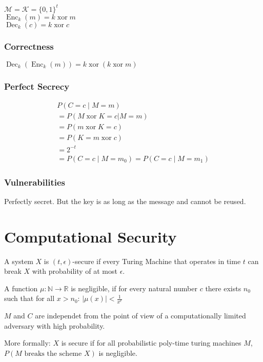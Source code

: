 \documentclass[11pt]{article}
\DeclareMathOperator{\Enc}{Enc}
\DeclareMathOperator{\Dec}{Dec}
\DeclareMathOperator{\xor}{xor}
\begin{document}
    $\mathcal{M} = \mathcal{K} = \{0, 1\}^t$\\
    $\Enc_k(m) = k \xor m$\\
    $\Dec_k(c) = k \xor c$

    \subsubsection{Correctness}

    $\Dec_k(\Enc_k(m)) = k \xor (k \xor m)$

    \subsubsection{Perfect Secrecy}

    \begin{align}
        P(C = c \mid M = m)\\
        = P(M \xor K = c | M = m)\\
        = P(m \xor K = c)\\
        = P(K = m \xor c)\\
        = 2^{-t}\\
        = P(C = c \mid M = m_0) = P(C = c \mid M = m_1)
    \end{align}

    \subsubsection{Vulnerabilities}

    Perfectly secret. But the key is as long as the message and cannot be reused.

    \section{Computational Security}

    A system $X$ is $(t, \epsilon)$-secure if every Turing Machine
    that operates in time $t$ can break $X$ with probability of at most $\epsilon$.

    A function $\mu: \mathbb{N} \to \mathbb{R}$ is negligible, if for every natural number
    $c$ there exists $n_0$ such that for all $x > n_0$: $|\mu(x)| < \frac{1}{x^c}$ 

    $M$ and $C$ are independet from the point of view of a
    computationally limited adversary with high probability.

    More formally: $X$ is secure if for all probabilistic poly-time turing machines $M$,
    $P(M \textrm{ breaks the scheme } X)$ is negligible.
\end{document}
